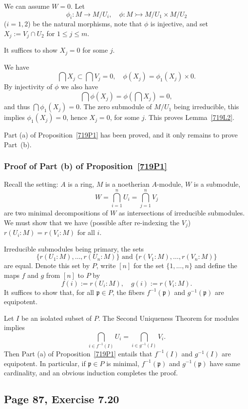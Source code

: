 \documentclass[parskip=half,fontsize=12pt]{scrartcl}%
\newcommand{\mf}{\mathfrak}
\newcommand{\ppp}{\mf p}
\newcommand{\mono}{\rightarrowtail}
\begin{document}
We can assume $W=0$. Let 
$$
\phi_i:M\to M/U_i,\quad\phi:M\mono M/U_1\times M/U_2
$$ 
($i=1,2$) be the natural morphisms, note that $\phi$ is injective, and set $X_j:=V_j\cap U_2$ for $1\le j\le m$. 

It suffices to show $X_j=0$ for some $j$.

We have 
$$
\bigcap X_j\subset \bigcap V_j=0,\quad\phi(X_j)=\phi_1(X_j)\times0.
$$ 
By injectivity of $\phi$ we also have 
$$
\bigcap\phi(X_j)=\phi\left(\bigcap X_j\right)=0,
$$ 
and thus $\bigcap\phi_1(X_j)=0$. The zero submodule of $M/U_1$ being ir\-re\-ducible, this implies $\phi_1(X_j)=0$, hence $X_j=0$, for some $j$. This proves Lemma~\ref{719L2}.

Part (a) of Proposition~\ref{719P1} has been proved, and it only remains to prove Part~(b).

\subsubsection{Proof of Part (b) of Proposition~\ref{719P1}}%

Recall the setting: $A$ is a ring, $M$ is a noetherian $A$-module, $W$ is a submodule, 
$$
W=\bigcap_{i=1}^nU_i=\bigcap_{j=1}^nV_j
$$ 
are two minimal decompositions of $W$ as intersections of irreducible submodules. We must show that we have (possible after re-indexing the $V_j$) $r(U_i:M)=r(V_i:M)$ for all $i$.

Irreducible submodules being primary, the sets 
$$
\{r(U_1:M),\dots,r(U_n:M)\}\text{ and }\{r(V_1:M),\dots,r(V_n:M)\}
$$ 
are equal. Denote this set by $P$, write $[n]$ for the set $\{1,\dots,n\}$ and define the maps $f$ and $g$ from $[n]$ to $P$ by 
$$
f(i):=r(U_i:M),\quad g(i):=r(V_i:M).
$$ 
It suffices to show that, for all $\ppp\in P$, the fibers $f^{-1}(\ppp)$ and $g^{-1}(\ppp)$ are equipotent. 

Let $I$ be an isolated subset of $P$. The Second Uniqueness Theorem for modules implies 
$$
\bigcap_{i\in f^{-1}(I)}U_i=\bigcap_{i\in g^{-1}(I)}V_i.
$$ 
Then Part (a) of Proposition~\ref{719P1} entails that $f^{-1}(I)$ and $g^{-1}(I)$ are equipotent. In particular, if $\ppp\in P$ is minimal, $f^{-1}(\ppp)$ and $g^{-1}(\ppp)$ have same cardinality, and an obvious induction completes the proof. 

\subsection{Page 87, Exercise 7.20}\label{720}%
\end{document}
